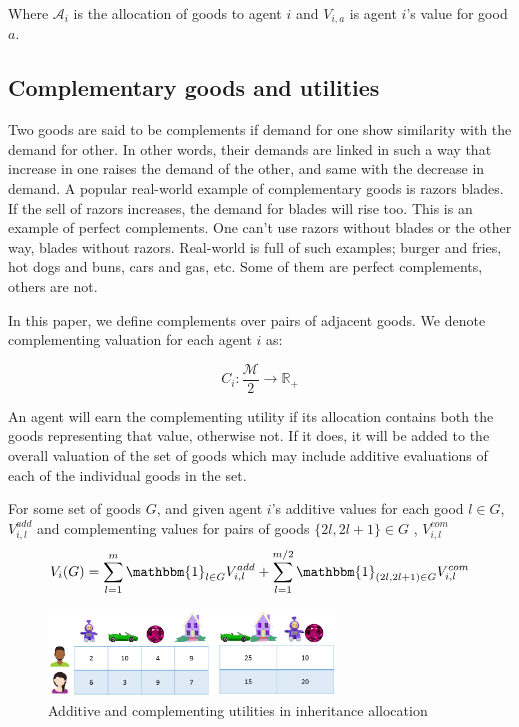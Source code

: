 Where $\mathcal{A}_i$ is the allocation of goods to agent $i$ and $V_{i,a}$ is agent $i$'s value for good $a$.

\subsection{Complementary goods and utilities}
\label{section_complementary}

Two goods are said to be complements if demand for one show similarity with the demand for other. In other words, their demands are linked in such a way that increase in one raises the demand of the other, and same with the decrease in demand. A popular real-world example of complementary goods is razors blades. If the sell of razors increases, the demand for blades will rise too. This is an example of perfect complements. One can't use razors without blades or the other way, blades without razors. Real-world is full of such examples; burger and fries, hot dogs and buns, cars and gas, etc. Some of them are perfect complements, others are not.

In this paper, we define complements over pairs of adjacent goods. We denote complementing valuation for each agent $i$ as: 

\[
    C_i: \frac{\mathcal{M}}{2} \rightarrow \mathbb{R_+}
\]

An agent will earn the complementing utility if its allocation contains both the goods representing that value, otherwise not. If it does, it will be added to the overall valuation of the set of goods which may include additive evaluations of each of the individual goods in the set.

For some set of goods $G$, and given agent $i$'s additive values for each good $l \in G$, $V_{i,l}^{add}$ and complementing values for pairs of goods $\{2l, 2l+1\} \in G$ , $V_{i,l}^{com}$
\[
    V_i(G) = \sum_{l=1}^m \mathbbm{1}_{l \in G}V_{i,l}^{add} + \sum_{l=1}^{m/2} \mathbbm{1}_{\left(2l,2l+1\right) \in G}V_{i,l}^{com}
\]

\begin{figure}
\includegraphics[width=3in]{images/complementary_values.png}
\caption{Additive and complementing utilities in inheritance allocation}
\label{fig_inherit_compl_val_ex}
\end{figure}

